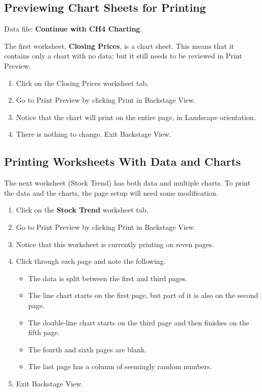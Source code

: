 \subsection{Previewing Chart Sheets for Printing}

Data file: \textbf{Continue with CH4 Charting}.

The first worksheet, \textbf{Closing Prices}, is a chart sheet. This means that it contains only a chart with no data; but it still needs to be reviewed in Print Preview.

\begin{enumerate}
	\item Click on the Closing Prices worksheet tab.
	\item Go to Print Preview by clicking Print in Backstage View.
	\item Notice that the chart will print on the entire page, in Landscape orientation.
	\item There is nothing to change. Exit Backstage View.
\end{enumerate}

\subsection{Printing Worksheets With Data and Charts}

The next worksheet (Stock Trend) has both data and multiple charts. To print the data and the charts, the page setup will need some modification.

\begin{enumerate}
	\item Click on the \textbf{Stock Trend} worksheet tab.
	\item Go to Print Preview by clicking Print in Backstage View.
	\item Notice that this worksheet is currently printing on seven pages.
	\item Click through each page and note the following.

	\begin{itemize}
		\item The data is split between the first and third pages.
		\item The line chart starts on the first page, but part of it is also on the second page.
		\item The double-line chart starts on the third page and then finishes on the fifth page.
		\item The fourth and sixth pages are blank.
		\item The last page has a column of seemingly random numbers.
	\end{itemize}

	\item Exit Backstage View.
\end{enumerate}

